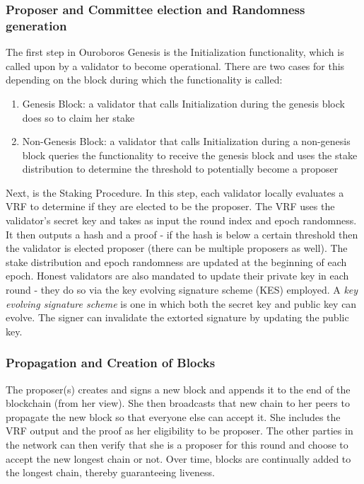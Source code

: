 \documentclass[10pt,journal,compsoc]{IEEEtran}
\begin{document}
\subsubsection{Proposer and Committee election and Randomness generation}
The first step in Ouroboros Genesis is the Initialization functionality, which is called upon by a validator to become operational. There are two cases for this depending on the block during which the functionality is called:
\begin{enumerate}
    \item Genesis Block: a validator that calls Initialization during the genesis block does so to claim her stake
    \item Non-Genesis Block: a validator that calls Initialization during a non-genesis block queries the functionality to receive the genesis block and uses the stake distribution to determine the threshold to potentially become a proposer
\end{enumerate}
Next, is the Staking Procedure. In this step, each validator locally evaluates a VRF to determine if they are elected to be the proposer. The VRF uses the validator’s secret key and takes as input the round index and epoch randomness. It then outputs a hash and a proof - if the hash is below a certain threshold then the validator is elected proposer (there can be multiple proposers as well). The stake distribution and epoch randomness are updated at the beginning of each epoch. Honest validators are also mandated to update their private key in each round - they do so via the key evolving signature scheme (KES) employed. A \emph{key evolving signature scheme} is one in which both the secret key and public key can evolve. The signer can invalidate the extorted signature by updating the public key. \cite{ItkisXie}

\subsubsection{Propagation and Creation of Blocks}
The proposer(s) creates and signs a new block and appends it to the end of the blockchain (from her view). She then broadcasts that new chain to her peers to propagate the new block so that everyone else can accept it. She includes the VRF output and the proof as her eligibility to be proposer. The other parties in the network can then verify that she is a proposer for this round and choose to accept the new longest chain or not. Over time, blocks are continually added to the longest chain, thereby guaranteeing liveness.
\end{document}

